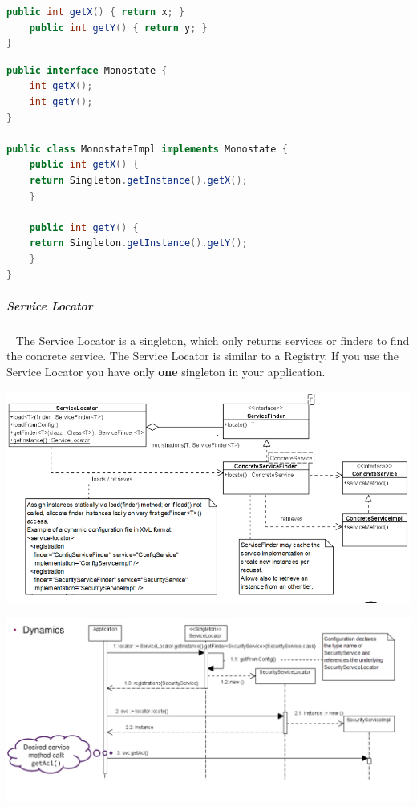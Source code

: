 \documentclass[11pt,twoside,landscape]{article}
\begin{document}
\begin{multicols}{3}
\begin{lstlisting}[language=java,label=lst:example-for-a-simple-monostate,caption={Example for a simple monostate},captionpos=b,numbers=none]
    public int getX() { return x; }
    public int getY() { return y; }
}
\end{lstlisting}


\begin{lstlisting}[language=java,label=lst:kill-a-singleton,caption={Kill a singleton},captionpos=b,numbers=none]
public interface Monostate {
    int getX();
    int getY();
}

public class MonostateImpl implements Monostate {
    public int getX() {
	return Singleton.getInstance().getX();
    }

    public int getY() {
	return Singleton.getInstance().getY();
    }
}
\end{lstlisting}
\subparagraph{Service Locator} \
\label{sec:org59c8b33}
The Service Locator is a singleton, which only returns services or finders to find the concrete service.
The Service Locator is similar to a Registry.
If you use the Service Locator you have only \textbf{one} singleton in your application.

{
\begin{center}
\includegraphics[width=.9\linewidth]{img/service_locator.png}
\end{center}
\label{fig:service-locator-uml}
}

{
\begin{center}
\includegraphics[width=.9\linewidth]{img/service_locator_dynamics.png}
\end{center}
\label{fig:service-locator-dynamics}
}


\end{multicols}
\end{document}
